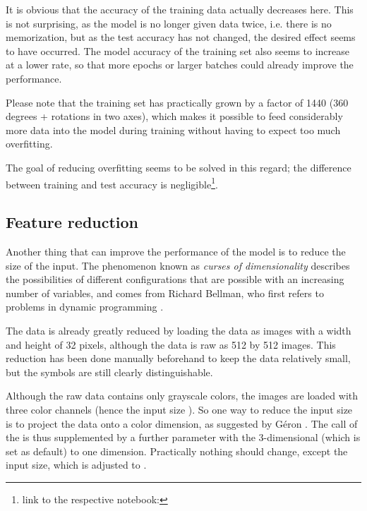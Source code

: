 It is obvious that the accuracy of the training data actually decreases here.
This is not surprising, as the model is no longer given data twice, i.e. there is no memorization, but as the test accuracy has not changed, the desired effect seems to have occurred.
The model accuracy of the training set also seems to increase at a lower rate, so that more epochs or larger batches could already improve the performance.

Please note that the training set has practically grown by a factor of 1440 (360 degrees + rotations in two axes), which makes it possible to feed considerably more data into the model during training without having to expect too much overfitting.

The goal of reducing overfitting seems to be solved in this regard; the difference between training and test accuracy is negligible\footnote{link to the respective notebook: }.

\subsection{Feature reduction}

Another thing that can improve the performance of the model is to reduce the size of the input.
The phenomenon known as \textit{curses of dimensionality} describes the possibilities of different configurations that are possible with an increasing number of variables, and comes from Richard Bellman, who first refers to problems in dynamic programming \cite[p.ix]{Bellman1957}.

The data is already greatly reduced by loading the data as images with a width and height of 32 pixels, although the data is raw as 512 by 512 images. This reduction has been done manually beforehand to keep the data relatively small, but the symbols are still clearly distinguishable.

Although the raw data contains only grayscale colors, the images are loaded with three color channels (hence the input size \code{[32, 32, 3]}).
So one way to reduce the input size is to project the data onto a color dimension, as suggested by Géron \cite[p.215]{Geron2019}.
The call of the  is thus supplemented by a further parameter  with the 3-dimensional  (which is set as default) to one dimension.
Practically nothing should change, except the input size, which is adjusted to \code{[32, 32, 1]}.

